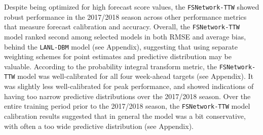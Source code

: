 \documentclass{article}\usepackage[]{graphicx}\usepackage[]{color}
\begin{document}
 

 
 
Despite being optimized for high forecast score values, the {\tt FSNetwork-TTW} showed robust performance in the 2017/2018 season across other performance metrics that measure forecast calibration and accuracy.
Overall, the {\tt FSNetwork-TTW} model ranked second among selected models in both RMSE and average bias, behind the {\tt LANL-DBM} model (see Appendix), suggesting that using separate weighting schemes for point estimates and predictive distribution may be valuable.
According to the probability integral transform metric\cite{angus1994probability,diebold1997evaluating}, the {\tt FSNetwork-TTW} model was well-calibrated for all four week-ahead targets (see Appendix).
It was slightly less well-calibrated for peak performance, and showed indications of having too narrow predictive distributions over the 2017/2018 season.
Over the entire training period prior to the 2017/2018 season, the {\tt FSNetwork-TTW} model calibration results suggested that in general the model was a bit conservative, with often a too wide predictive distribution (see Appendix).







\end{document}
